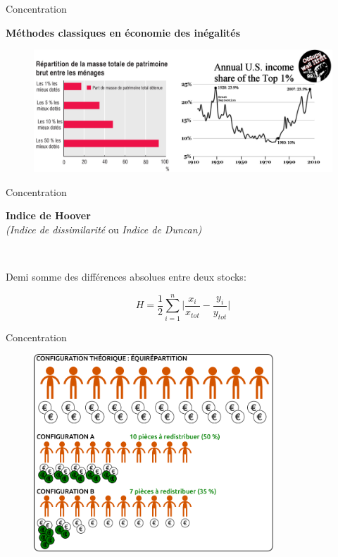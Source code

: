\begin{frame}{Concentration}

\textbf{Méthodes classiques en économie des inégalités}

\begin{figure}
\includegraphics[width=12cm]{Inequalities.jpg}
\end{figure}

\end{frame}


\begin{frame}{Concentration}

\textbf{Indice de Hoover} \\
\emph{(Indice de dissimilarité} ou \emph{Indice de Duncan)}

~

Demi somme des différences absolues entre deux stocks:

\begin{equation}
\nonumber
H = \frac{1}{2} \sum_{i=1}^n \bigg| \frac{x_i}{x_{tot}} - \frac{y_i}{y_{tot}} \bigg|
\end{equation}

\end{frame}


\begin{frame}{Concentration}

\begin{figure}
\includegraphics[width=9cm]{Gateau2.pdf}
\end{figure}

\end{frame}



